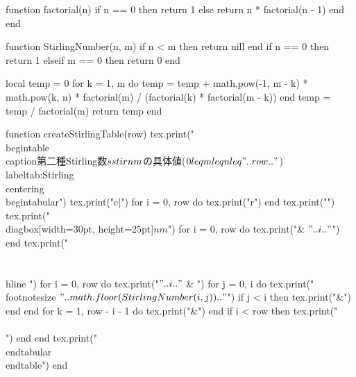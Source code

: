 \documentclass[a4paper,draft]{ltjsarticle}
\begin{document}
\begin{luacode*}
    function factorial(n)
        if n == 0 then
            return 1
        else
            return n * factorial(n - 1)
        end
    end


    function StirlingNumber(n, m)
        if n < m then
            return nill
        end
        if n == 0 then
            return 1
        elseif m == 0 then
            return 0
        end

        local temp = 0
        for k = 1, m do
            temp = temp + math.pow(-1, m - k) * math.pow(k, n) * factorial(m) / (factorial(k) * factorial(m - k))
        end
        temp = temp / factorial(m)
        return temp
    end


    function createStirlingTable(row)
        tex.print("\\begin{table}\\caption{第二種Stirling数$\\sstir{n}{m}$の具体値($0\\leq m \\leq n\\leq"..row.."$)}\\label{tab:Stirling}\\centering\\begin{tabular}{")
        tex.print("c|")
        for i = 0, row do
            tex.print("r")
        end
        tex.print("}")
        tex.print("\\diagbox[width=30pt, height=25pt]{$n$}{$m$}")
        for i = 0, row do
            tex.print("& $"..i.."$")
        end
        tex.print("\\\\ \\hline ")
        for i = 0, row do
            tex.print("$"..i.."$ & ")
            for j = 0, i do
                tex.print("\\footnotesize $"..math.floor(StirlingNumber(i, j)).."$")
                if j < i then
                    tex.print("&")
                end
            end
            for k = 1, row - i - 1 do
                tex.print("&")
            end
            if i < row then
                tex.print("\\\\")
            end
        end
        tex.print("\\end{tabular}\\end{table}")
    end
\end{luacode*}


\begin{landscape}
\end{landscape}
\end{document}
